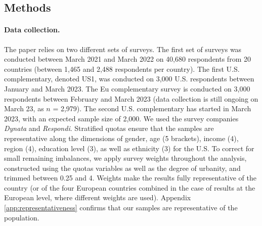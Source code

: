 \begin{small} %
\section*{\normalsize Methods}\label{sec:methods} %
\paragraph{\small Data collection.} %
The paper relies on two different sets of surveys. The first set of surveys was conducted between March 2021 and March 2022 on 40,680 respondents from 20 countries  (between 1,465 and 2,488 respondents per country). The first U.S. complementary, denoted US1, was conducted on 3,000 U.S. respondents between January and March 2023. The Eu complementary survey is conducted on 3,000 respondents between February and March 2023 (data collection is still ongoing on March 23, as $n$ = 2,979). The second U.S. complementary has started in March 2023, with an expected sample size of 2,000. 
We used the survey companies \emph{Dynata} and \emph{Respondi}. Stratified quotas ensure that the samples are representative along the dimensions of gender, age (5 brackets), income (4), region (4), education level (3), as well as ethnicity (3) for the U.S. %
To correct for small remaining imbalances, we apply survey weights throughout the analysis, constructed using the quotas variables as well as the degree of urbanity, and trimmed between 0.25 and 4. Weights make the results fully representative of the country (or of the four European countries combined in the case of results at the European level, where different weights are used). %
Appendix \ref{app:representativeness} confirms that our samples are representative of the population.


\end{small}

